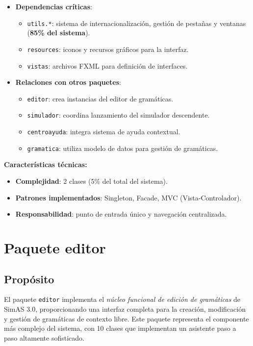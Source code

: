 \begin{itemize}
    \item \textbf{Dependencias críticas}:
    \begin{itemize}
        \item \texttt{utils.*}: sistema de internacionalización, gestión de pestañas y ventanas (\textbf{85\% del sistema}).
        \item \texttt{resources}: iconos y recursos gráficos para la interfaz.
        \item \texttt{vistas}: archivos FXML para definición de interfaces.
    \end{itemize}
    \item \textbf{Relaciones con otros paquetes}:
    \begin{itemize}
        \item \texttt{editor}: crea instancias del editor de gramáticas.
        \item \texttt{simulador}: coordina lanzamiento del simulador descendente.
        \item \texttt{centroayuda}: integra sistema de ayuda contextual.
        \item \texttt{gramatica}: utiliza modelo de datos para gestión de gramáticas.
    \end{itemize}
\end{itemize}

\textbf{Características técnicas:}
\begin{itemize}
    \item \textbf{Complejidad}: 2 clases (5\% del total del sistema).
    \item \textbf{Patrones implementados}: Singleton, Facade, MVC (Vista-Controlador).
    \item \textbf{Responsabilidad}: punto de entrada único y navegación centralizada.
\end{itemize}

\section{Paquete editor}

\subsection{Propósito}

El paquete \texttt{editor} implementa el \textit{núcleo funcional de edición de gramáticas} de SimAS 3.0, proporcionando una interfaz completa para la creación, modificación y gestión de gramáticas de contexto libre. Este paquete representa el componente más complejo del sistema, con 10 clases que implementan un asistente paso a paso altamente sofisticado.


